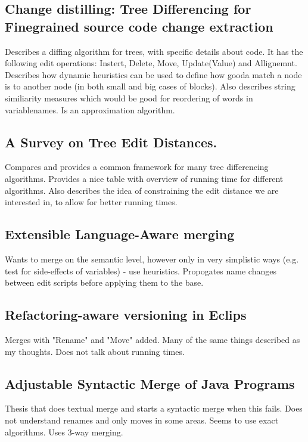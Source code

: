 \documentclass[12pt]{article}
\begin{document}
\subsection{Change distilling: Tree Differencing for Finegrained source code change extraction}
Describes a diffing algorithm for trees, with specific details about code. It has the following edit operations: Instert, Delete, Move, Update(Value) and Allignemnt. Describes how dynamic heuristics can be used to define how gooda match a node is to another node (in both small and big cases of blocks). Also describes string similiarity measures which would be good for reordering of words in variablenames. Is an approximation algorithm.

\subsection{A Survey on Tree Edit Distances.}
Compares and provides a common framework for many tree differencing algorithms. Provides a nice table with overview of running time for different algorithms. Also describes the idea of constraining the edit distance we are interested in, to allow for better running times.

\subsection{Extensible Language-Aware merging}
Wants to merge on the semantic level, however only in very simplistic ways (e.g. test for side-effects of variables) - use heuristics. Propogates name changes between edit scripts before applying them to the base.

\subsection{Refactoring-aware versioning in Eclips}
Merges with "Rename" and "Move" added. Many of the same things described as my thoughts. Does not talk about running times.

\subsection{Adjustable Syntactic Merge of Java Programs}
Thesis that does textual merge and starts a syntactic merge when this fails. Does not understand renames and only moves in some areas. Seems to use exact algorithms. Uses 3-way merging.





\end{document}
